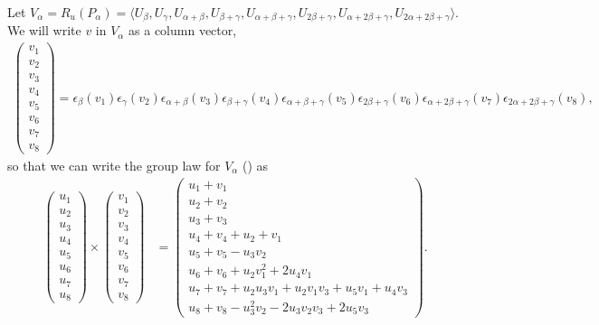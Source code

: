 			Let $V_\alpha = R_u(P_\alpha) = \langle U_\beta, U_\gamma, U_{\alpha+\beta}, U_{\beta+\gamma}, U_{\alpha+\beta+\gamma}, U_{2\beta+\gamma}, U_{\alpha+2\beta+\gamma}, U_{2\alpha+2\beta+\gamma}\rangle$.
			We will write $v$ in $V_\alpha$ as a column vector,
			\begin{align*}
			\left(\begin{matrix}
					v_1\\
					v_2\\
					v_3\\
					v_4\\
					v_5\\
					v_6\\
					v_7\\
					v_8
					\end{matrix}\right)
=\epsilon_{\beta}(v_1)
\epsilon_{\gamma}(v_2)
\epsilon_{\alpha+\beta}(v_3)
\epsilon_{\beta+\gamma}(v_4)
\epsilon_{\alpha+\beta+\gamma}(v_5)
\epsilon_{2\beta+\gamma}(v_6)
\epsilon_{\alpha+2\beta+\gamma}(v_7)
	\epsilon_{2\alpha+2\beta+\gamma}(v_8),
	\end{align*}
	so that we can write the group law for $V_\alpha$ (\cite[\S 33.3, \S 33.4]{humphreys1975linear}) as
	\begin{align*}
	\left(\begin{matrix}
			u_1\\
			u_2\\
			u_3\\
			u_4\\
			u_5\\
			u_6\\
			u_7\\
			u_8
			\end{matrix}\right)
	\times
	\left(\begin{matrix}
			v_1\\
			v_2\\
			v_3\\
			v_4\\
			v_5\\
			v_6\\
			v_7\\
			v_8
			\end{matrix}\right)
	&=
	\left(\begin{matrix}
			u_1 + v_1\\
			u_2 + v_2\\
			u_3 + v_3\\
			u_4 + v_4 + u_2 + v_1\\
			u_5 + v_5 - u_3v_2\\
			u_6 + v_6 + u_2v_1^2 + 2u_4v_1\\
			u_7 + v_7 + u_2u_3v_1 + u_2v_1v_3 + u_5v_1 + u_4v_3\\
			u_8 + v_8 - u_3^2v_2 - 2u_3v_2v_3 + 2u_5v_3
			\end{matrix}\right).
	\end{align*}
